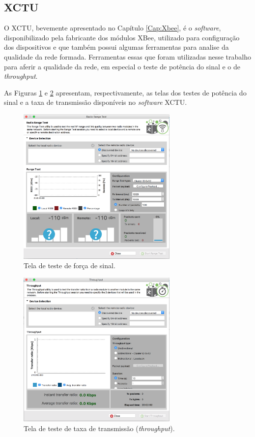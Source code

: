 \subsection{XCTU}

O XCTU, bevemente apresentado no Capítulo \ref{Cap:Xbee}, é o \emph{software}, disponibilizado pela fabricante dos módulos XBee, utilizado para configuração dos dispositivos e que também possui algumas ferramentas para analise da qualidade da rede formada. Ferramentas essas que foram utilizadas nesse trabalho para aferir a qualidade da rede, em especial o teste de potência do sinal e o de \emph{throughput}.

As Figuras \ref{fig:rangeTest} e \ref{fig:throughput} apresentam, respectivamente, as telas dos testes de potência do sinal e a taxa de transmissão disponíveis no \emph{software} XCTU.

\begin{figure}[h!] 
\center
\includegraphics[width=0.7\textwidth]{RangeTest.png}
\caption{Tela de teste de força de sinal.} 
\label{fig:rangeTest}
\end{figure}

\begin{figure}[h!] 
\center
\includegraphics[width=0.7\textwidth]{ThroughputTest.png}
\caption{Tela de teste de taxa de transmissão (\emph{throughput}).} 
\label{fig:throughput}
\end{figure}

